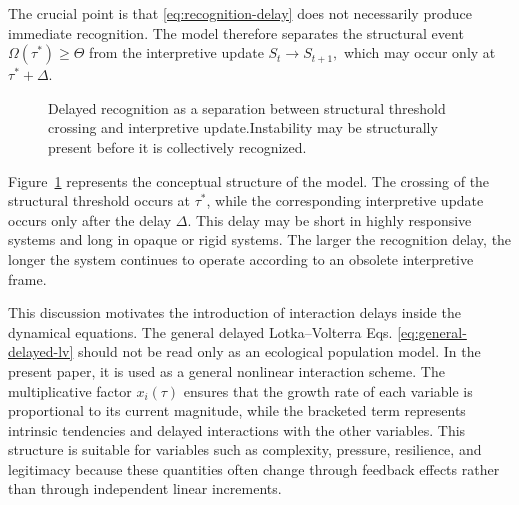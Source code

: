 \documentclass[11pt]{article}
\begin{document}
The crucial point is that \eqref{eq:recognition-delay} does not necessarily
produce immediate recognition. The model therefore separates the structural
event
$
\Omega(\tau^\ast)\geq \Theta
$
from the interpretive update
$
S_t^{\mathrm{}}\longrightarrow S_{t+1}^{\mathrm{}},
$
which may occur only at $\tau^\ast+\Delta$.

\begin{figure}[ht]
	\centering
	\caption{Delayed recognition as a separation between structural threshold crossing and interpretive update.Instability may be structurally present before it is collectively recognized.}
	\label{fig:delayed-recognition}
\end{figure}

Figure~\ref{fig:delayed-recognition} represents the conceptual structure of the
model. The crossing of the structural threshold occurs at $\tau^\ast$, while the
corresponding interpretive update occurs only after the delay $\Delta$. This
delay may be short in highly responsive systems and long in opaque or rigid
systems. The larger the recognition delay, the longer the system continues to
operate according to an obsolete interpretive frame.


This discussion motivates the introduction of interaction delays inside
the dynamical equations. The general delayed Lotka--Volterra 
Eqs. \eqref{eq:general-delayed-lv} should not be read only as an ecological
population model. In the present paper, it is used as a general nonlinear
interaction scheme. The multiplicative factor $x_i(\tau)$ ensures that the
growth rate of each variable is proportional to its current magnitude, while the
bracketed term represents intrinsic tendencies and delayed interactions with
the other variables. This structure is suitable for variables such as
complexity, pressure, resilience, and legitimacy because these quantities often
change through feedback effects rather than through independent linear
increments.
\end{document}
